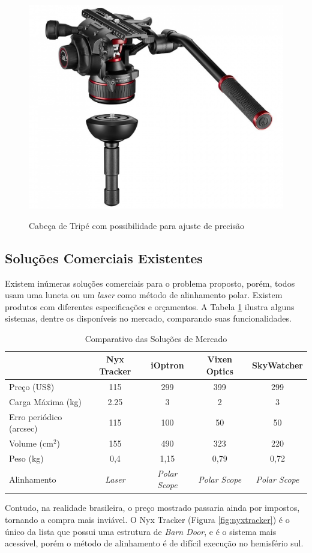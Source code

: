 \begin{figure}[!htb]
	\centering
	\caption{Cabeça de Tripé com possibilidade para ajuste de precisão}
	\includegraphics[width=0.4\linewidth]{figuras/revisaobiblio/video-head}
	\label{fig:ballheadfilmagem}
\end{figure}

\subsection{Soluções Comerciais Existentes}

Existem inúmeras soluções comerciais para o problema proposto, porém, todos usam uma luneta ou um \textit{laser} como método de alinhamento polar. Existem produtos com diferentes especificações e orçamentos. A Tabela \ref{tabela_benchmark} ilustra alguns sistemas, dentre os disponíveis no mercado, comparando suas funcionalidades. 


\begin{table}[htb]
	\caption{Comparativo das Soluções de Mercado}
	\begin{tabular}{l|cccc}
		& Nyx Tracker & iOptron & Vixen Optics & SkyWatcher \\ \hline
		Preço (US\$) & 115 & 299 & 399 & 299 \\\hline
		Carga Máxima (kg) & 2.25 & 3 & 2 & 3 \\\hline
		Erro periódico (arcsec) & 115 & 100 & 50 & 50 \\\hline
		Volume (cm$^2$) & 155 & 490 & 323 & 220 \\\hline
		Peso (kg) & 0,4 & 1,15 & 0,79 & 0,72 \\\hline
		Alinhamento & \textit{Laser} & \textit{Polar Scope} & \textit{Polar Scope} & \textit{Polar Scope} \\
	\end{tabular}
	\label{tabela_benchmark}
\end{table}

Contudo, na realidade brasileira, o preço mostrado passaria ainda por impostos, tornando a compra mais inviável. O Nyx Tracker (Figura \ref{fig:nyxtracker}) é o único da lista que possui uma estrutura de \textit{Barn Door}, e é o sistema mais acessível, porém o método de alinhamento é de difícil execução no hemisfério sul.

